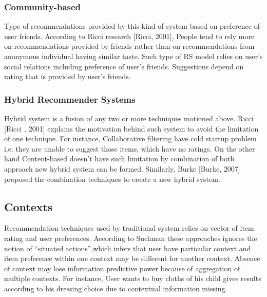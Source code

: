 \subsubsection{Community-based}

Type of recommendations provided by this kind of system based on preference of user friends. According to Ricci research [Ricci, 2001], People tend to rely more on recommendations provided by friends rather than on recommendations from anonymous individual having similar taste. Such type of RS model relies on user’s social relations including preference of user’s friends. Suggestions depend on rating that is provided by user’s friends.

\subsubsection{Hybrid Recommender Systems}

Hybrid system is a fusion of any two or more techniques motioned above. Ricci [Ricci , 2001] explains the motivation behind such system to avoid the limitation of one technique. For instance, Collaborative filtering have cold startup problem i.e. they are unable to suggest those items, which have no ratings. On the other hand Content-based doesn’t have such limitation by combination of both approach new hybrid system can be formed. Similarly, Burke [Burke, 2007] proposed the combination techniques to create a new hybrid system.

\subsection{Contexts}
Recommendation techniques used by traditional system relies on vector of item rating and user preferences. According to Suchman \cite{suchman1986plans} these approaches ignores the notion of “situated actions”,which infers that user have particular context and item preference within one context may be different for another context\cite{adomavicius2011context}.
Absence of context may lose information predictive power because of aggregation of multiple contexts. For instance, User wants to buy cloths of his child gives results according to his dressing choice due to contextual information missing.\newline

